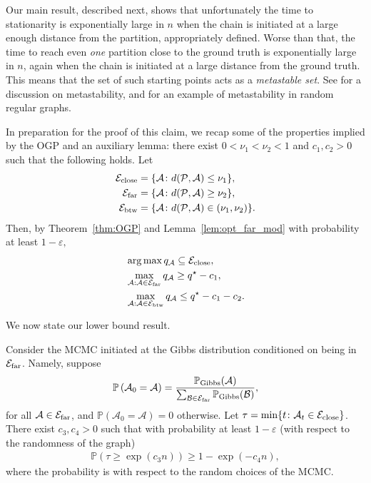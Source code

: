 \documentclass[a4paper,UKenglish,cleveref, autoref, thm-restate,numberwithinsect]{lipics-v2021}
\newcommand{\pr}{{\mathbb P}}
\newcommand{\eps}{\varepsilon}
\newcommand{\Fc}{
}
\begin{document}
Our main result, described next, shows that unfortunately the time to stationarity is exponentially large in $n$ when the chain
is initiated at a large enough distance from the partition, appropriately defined. 
Worse than that, the time to reach even \emph{one} partition close to  the ground
truth is exponentially large in $n$, again when the chain is initiated at a large distance from the ground truth. This means that the set of such starting points acts as a \emph{metastable set}. See \cite{BovHol15} for a discussion on metastability, and \cite{CojGalGolRavSteVig23} for an example of metastability in random regular graphs.

In preparation for the proof of this claim, we recap some of the properties implied by the OGP {\Fc and an auxiliary lemma}: there exist $0<\nu_1<\nu_2<1$ and $c_1,c_2>0$ such
that the following holds. Let 
\begin{align*}
\mathcal{E}_{\rm close} &= \lbrace \mathcal{A}\colon d(\mathcal{P},\mathcal{A})\le \nu_1 \rbrace,  \\
\mathcal{E}_{\rm far} &= \lbrace \mathcal{A}\colon  d(\mathcal{P},\mathcal{A})\ge \nu_2 \rbrace,  \\
\mathcal{E}_{\rm btw} &= \lbrace \mathcal{A}\colon  d(\mathcal{P},\mathcal{A})\in (\nu_1,\nu_2) \rbrace .
\end{align*}
Then, {\Fc by Theorem~\ref{thm:OGP} and Lemma~\ref{lem:opt_far_mod}} with probability at least $1-\eps,$ 
\begin{align}
&\arg\max %
q_{\mathcal{A}} %
\subseteq \mathcal{E}_{\rm close}, \label{eq:OGP-implications-1}\\
&\max_{\mathcal{A}: \mathcal{A}\in \mathcal{E}_{\rm far}} q_{\mathcal{A}}\ge q^{\star} - c_1, \label{eq:OGP-implications-2}\\
&\max_{\mathcal{A}: \mathcal{A}\in \mathcal{E}_{\rm btw}} q_{\mathcal{A}}\le q^{\star} - c_1-c_2. \label{eq:OGP-implications-3}
\end{align}

We now state our lower bound result.

\begin{theorem}\label{thm:slow_mixing_formal}
Consider the MCMC initiated at the Gibbs distribution conditioned on being in $\mathcal{E}_{\rm far}$. Namely, suppose
\begin{align*}
\pr\left(\mathcal{A}_0=\mathcal{A}\right) =  
{\pr_{\rm Gibbs}(\mathcal{A})  \over \sum_{\mathcal{B}\in \mathcal{E}_{\rm far}}  \pr_{\rm Gibbs}(\mathcal{B}) },
\end{align*}
for all $\mathcal{A}\in \mathcal{E}_{\rm far}$, and $\pr\left(\mathcal{A}_0=\mathcal{A}\right)=0$ otherwise.
Let 
$\tau=\min\lbrace t\colon  \mathcal{A}_t \in  \mathcal{E}_{\rm close}\rbrace$. There exist $c_3,c_4>0$ such that 
 with probability at least $1-\eps$ (with respect
to the randomness of the graph) 
\begin{align*}
\pr\left(\tau \ge \exp(c_3 n)\right) \ge 1-\exp(-c_4 n),
\end{align*}
where the probability is with respect to the random choices of the MCMC.
\end{theorem}
\end{document}
